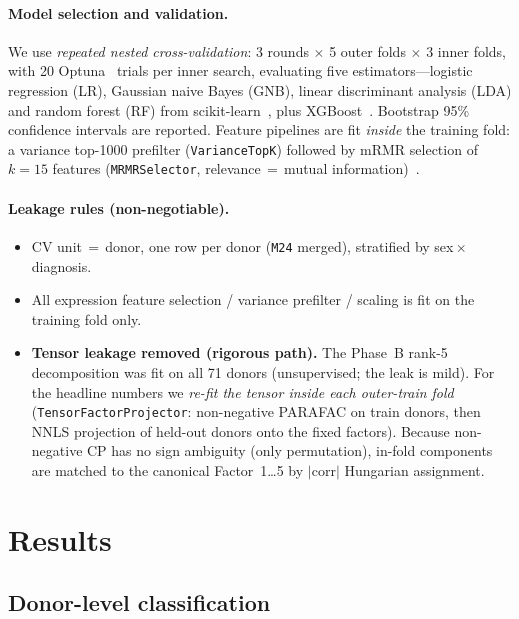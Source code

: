 \documentclass[11pt]{article}
\newcommand{\code}[1]{\texttt{\small #1}}
\begin{document}
\paragraph{Model selection and validation.} We use \emph{repeated nested
cross-validation}: 3 rounds $\times$ 5 outer folds $\times$ 3 inner folds, with
20 Optuna~\cite{optuna} trials per inner search, evaluating five
estimators---logistic regression (LR), Gaussian naive Bayes (GNB), linear
discriminant analysis (LDA) and random forest (RF) from
scikit-learn~\cite{sklearn}, plus XGBoost~\cite{xgboost}. Bootstrap 95\% confidence
intervals are reported. Feature pipelines are fit \emph{inside} the training
fold: a variance top-1000 prefilter (\code{VarianceTopK}) followed by mRMR
selection of $k=15$ features (\code{MRMRSelector}, relevance\,$=$\,mutual
information)~\cite{mrmr}.

\paragraph{Leakage rules (non-negotiable).}
\begin{itemize}
\item CV unit\,$=$\,donor, one row per donor (\code{M24} merged), stratified by
sex\,$\times$\,diagnosis.
\item All expression feature selection / variance prefilter / scaling is fit on
the training fold only.
\item \textbf{Tensor leakage removed (rigorous path).} The Phase~B rank-5
decomposition was fit on all 71 donors (unsupervised; the leak is mild). For
the headline numbers we \emph{re-fit the tensor inside each outer-train fold}
(\code{TensorFactorProjector}: non-negative PARAFAC on train donors, then NNLS
projection of held-out donors onto the fixed factors). Because non-negative CP
has no sign ambiguity (only permutation), in-fold components are matched to the
canonical Factor~1\ldots5 by $|\mathrm{corr}|$ Hungarian assignment.
\end{itemize}

\section{Results}

\subsection{Donor-level classification}
\end{document}
